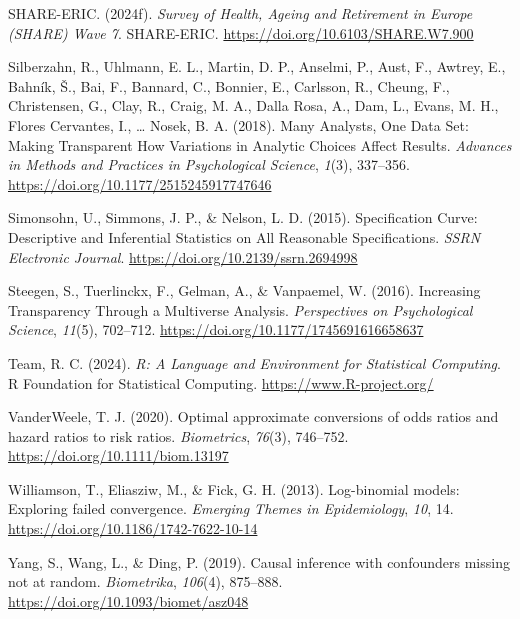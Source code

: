 \documentclass[
  man,
  floatsintext,
  longtable,
  nolmodern,
  notxfonts,
  notimes,
  colorlinks=true,linkcolor=blue,citecolor=blue,urlcolor=blue]{apa7}
\newlength{\cslhangindent}
\newenvironment{CSLReferences}[2] %
 {\begin{list}{}{%
  \setlength{\itemindent}{0pt}
  \setlength{\leftmargin}{0pt}
  \setlength{\parsep}{0pt}
  \ifodd #1
   \setlength{\leftmargin}{\cslhangindent}
   \setlength{\itemindent}{-1\cslhangindent}
  \fi
  \setlength{\itemsep}{#2\baselineskip}}}
 {\end{list}}
\begin{document}
\begin{CSLReferences}{1}{0}
SHARE-ERIC. (2024f). \emph{Survey of {Health}, {Ageing} and {Retirement}
in {Europe} ({SHARE}) {Wave} 7}. SHARE-ERIC.
\url{https://doi.org/10.6103/SHARE.W7.900}

Silberzahn, R., Uhlmann, E. L., Martin, D. P., Anselmi, P., Aust, F.,
Awtrey, E., Bahník, Š., Bai, F., Bannard, C., Bonnier, E., Carlsson, R.,
Cheung, F., Christensen, G., Clay, R., Craig, M. A., Dalla Rosa, A.,
Dam, L., Evans, M. H., Flores Cervantes, I., \ldots{} Nosek, B. A.
(2018). Many {Analysts}, {One} {Data} {Set}: {Making} {Transparent}
{How} {Variations} in {Analytic} {Choices} {Affect} {Results}.
\emph{Advances in Methods and Practices in Psychological Science},
\emph{1}(3), 337--356. \url{https://doi.org/10.1177/2515245917747646}

Simonsohn, U., Simmons, J. P., \& Nelson, L. D. (2015). Specification
{Curve}: {Descriptive} and {Inferential} {Statistics} on {All}
{Reasonable} {Specifications}. \emph{SSRN Electronic Journal}.
\url{https://doi.org/10.2139/ssrn.2694998}

Steegen, S., Tuerlinckx, F., Gelman, A., \& Vanpaemel, W. (2016).
Increasing {Transparency} {Through} a {Multiverse} {Analysis}.
\emph{Perspectives on Psychological Science}, \emph{11}(5), 702--712.
\url{https://doi.org/10.1177/1745691616658637}

Team, R. C. (2024). \emph{R: {A} {Language} and {Environment} for
{Statistical} {Computing}}. R Foundation for Statistical Computing.
\url{https://www.R-project.org/}

VanderWeele, T. J. (2020). Optimal approximate conversions of odds
ratios and hazard ratios to risk ratios. \emph{Biometrics},
\emph{76}(3), 746--752. \url{https://doi.org/10.1111/biom.13197}

Williamson, T., Eliasziw, M., \& Fick, G. H. (2013). Log-binomial
models: Exploring failed convergence. \emph{Emerging Themes in
Epidemiology}, \emph{10}, 14.
\url{https://doi.org/10.1186/1742-7622-10-14}

Yang, S., Wang, L., \& Ding, P. (2019). Causal inference with
confounders missing not at random. \emph{Biometrika}, \emph{106}(4),
875--888. \url{https://doi.org/10.1093/biomet/asz048}


\end{CSLReferences}
\end{document}
